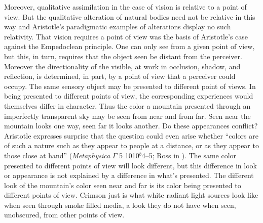 Moreover, qualitative assimilation in the case of vision is relative to a point of view. But the qualitative alteration of natural bodies need not be relative in this way and Aristotle's paradigmatic examples of alterations display no such relativity. That vision requires a point of view was the basis of Aristotle's case against the Empedoclean principle. One can only see from a given point of view, but this, in turn, requires that the object seen be distant from the perceiver. Moreover the directionality of the visible, at work in occlusion, shadow, and reflection, is determined, in part, by a point of view that a perceiver could occupy. The same sensory object may be presented to different point of views. In being presented to different points of view, the corresponding experiences would themselves differ in character. Thus the color a mountain presented through an imperfectly transparent sky may be seen from near and from far. Seen near the mountain looks one way, seen far it looks another. Do these appearances conflict? Aristotle expresses surprise that the question could even arise whether ``colors are of such a nature such as they appear to people at a distance, or as they appear to those close at hand'' (\emph{Metaphysica} \( \Gamma \) 5 1010\( ^{b} \)4--5; Ross in \citealt[55]{Barnes:1984kx}). The same color presented to different points of view will look different, but this difference in look or appearance is not explained by a difference in what's presented. The different look of the mountain's color seen near and far is its color being presented to different points of view. Crimson just is what white radiant light sources look like when seen through smoke filled media, a look they do not have when seen, unobscured, from other points of view.



